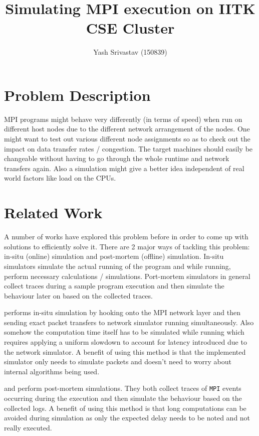 \documentclass[10pt,conference]{IEEEtran}
\title{Simulating MPI execution on IITK CSE Cluster}
\author{Yash Srivastav (150839)}
\begin{document}
\maketitle

\section{Problem Description}
MPI programs might behave very differently (in terms of speed) when run on
different host nodes due to the different network arrangement of the nodes.
One might want to test out various different node assignments so as to check
out the impact on data transfer rates / congestion. The target machines should
easily be changeable without having to go through the whole runtime and network
transfers again. Also a simulation might give a better idea independent of real
world factors like load on the CPUs.

\section{Related Work}
A number of works have explored this problem before in order to come up with
solutions to efficiently solve it. There are 2 major ways of tackling this
problem: in-situ (online) simulation and post-mortem (offline) simulation.
In-situ simulators simulate the actual running of the program and while running,
perform necessary calculations / simulations. Port-mortem simulators in general
collect traces during a sample program execution and then simulate the behaviour
later on based on the collected traces.

\cite{netsim} performs in-situ simulation by hooking onto the MPI network layer
and then sending exact packet transfers to network simulator running
simultaneously. Also somehow the computation time itself has to be simulated
while running which requires applying a uniform slowdown to account for latency
introduced due to the network simulator. A benefit of using this method is that
the implemented simulator only needs to simulate packets and doesn't need to
worry about internal algorithms being used.

\cite{time-independent-trace-sim} and \cite{better-sim-ethernet} perform
post-mortem simulations. They both collect traces of \texttt{MPI} events
occurring during the execution and then simulate the behaviour based on the
collected logs. A benefit of using this method is that long computations can be
avoided during simulation as only the expected delay needs to be noted and not
really executed.
\end{document}
